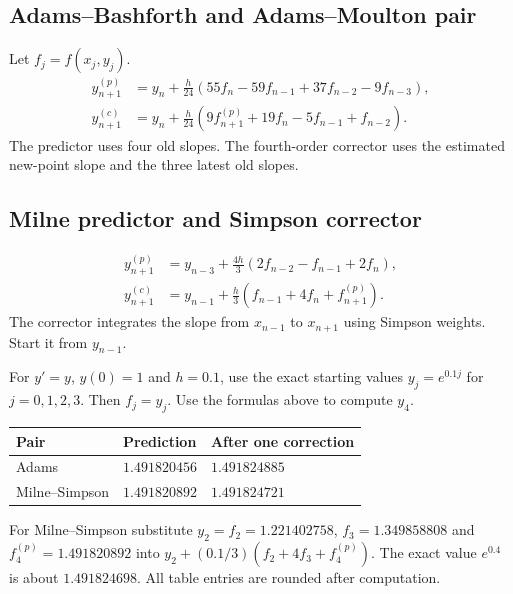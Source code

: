 \documentclass[12pt,a4paper]{article}
\begin{document}
\subsection{Adams--Bashforth and Adams--Moulton pair}
\begin{tcolorbox}[formulabox, title={Adams pair on a uniform grid}]
Let $f_j=f(x_j,y_j)$.
\[
\begin{aligned}
y_{n+1}^{(p)}&=y_n+\frac{h}{24}
 (55f_n-59f_{n-1}+37f_{n-2}-9f_{n-3}),\\
y_{n+1}^{(c)}&=y_n+\frac{h}{24}
 (9f_{n+1}^{(p)}+19f_n-5f_{n-1}+f_{n-2}).
\end{aligned}
\]
The predictor uses four old slopes. The fourth-order corrector uses the estimated new-point slope and the three latest old slopes.
\end{tcolorbox}

\subsection{Milne predictor and Simpson corrector}
\begin{tcolorbox}[formulabox, title={Milne--Simpson pair}]
\[
\begin{aligned}
y_{n+1}^{(p)}&=y_{n-3}+\frac{4h}{3}
 (2f_{n-2}-f_{n-1}+2f_n),\\
y_{n+1}^{(c)}&=y_{n-1}+\frac{h}{3}
 (f_{n-1}+4f_n+f_{n+1}^{(p)}).
\end{aligned}
\]
The corrector integrates the slope from $x_{n-1}$ to $x_{n+1}$ using Simpson weights. Start it from $y_{n-1}$.
\end{tcolorbox}

\begin{tcolorbox}[examplebox, title={Compare both pairs on one new node}]
For $y'=y$, $y(0)=1$ and $h=0.1$, use the exact starting values $y_j=e^{0.1j}$ for $j=0,1,2,3$. Then $f_j=y_j$. Use the formulas above to compute $y_4$.
\par\vspace{5pt}
\begingroup
\setlength{\extrarowheight}{1pt}
\noindent\begin{tabularx}{\linewidth}{|B{3.5cm}|Y|Y|}
\hline
\textbf{Pair} & \textbf{Prediction} & \textbf{After one correction} \\ \hline
Adams & $1.491820456$ & $1.491824885$ \\ \hline
Milne--Simpson & $1.491820892$ & $1.491824721$ \\ \hline
\end{tabularx}\par
\endgroup
For Milne--Simpson substitute $y_2=f_2=1.221402758$, $f_3=1.349858808$ and $f_4^{(p)}=1.491820892$ into $y_2+(0.1/3)(f_2+4f_3+f_4^{(p)})$. The exact value $e^{0.4}$ is about $1.491824698$. All table entries are rounded after computation.
\end{tcolorbox}
\end{document}
